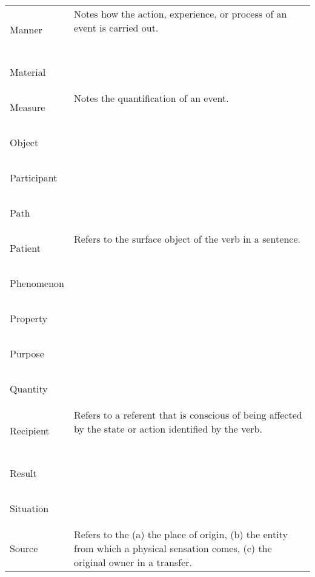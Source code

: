 \documentclass[a4paper,11pt, onecolumn,twoside]{article}
\begin{document}
\begin{longtable}{ p{}  p{} }
\midrule
 \multirow{2}{*}{Manner} & Notes how the action, experience, or process of an event is carried out. \\ 
        & ~ \\
\midrule
 \multirow{2}{*}{Material} & ~ \\ 
        & ~ \\
\midrule
 \multirow{2}{*}{Measure} & Notes the quantification of an event. \\ 
        & ~ \\
\midrule
 \multirow{2}{*}{Object} & ~ \\ 
        & ~ \\
\midrule
 \multirow{2}{*}{Participant} & ~ \\ 
        & ~ \\
\midrule
 \multirow{2}{*}{Path} & ~ \\ 
        & ~ \\
\midrule
 \multirow{2}{*}{Patient} & Refers to the surface object of the verb in a sentence. \\ 
        & ~ \\
\midrule
 \multirow{2}{*}{Phenomenon} & ~ \\  %
        & ~ \\
\midrule
 \multirow{2}{*}{Property} & ~ \\ 
        & ~ \\
\midrule
 \multirow{2}{*}{Purpose} & ~ \\ 
        & ~ \\
\midrule
 \multirow{2}{*}{Quantity} & ~ \\  %
        & ~ \\
\midrule
 \multirow{2}{*}{Recipient} & Refers to a referent that is conscious of being affected by the state or action identified by the verb. \\ 
        & ~ \\
\midrule
 \multirow{2}{*}{Result} & ~ \\ 
        & ~ \\
\midrule
 \multirow{2}{*}{Situation} & ~ \\ 
        & ~ \\
\midrule
 \multirow{2}{*}{Source} & Refers to the (a) the place of origin, (b) the entity from which a physical sensation comes, (c) the original owner in a transfer. \\ 

\end{longtable}
\end{document}

